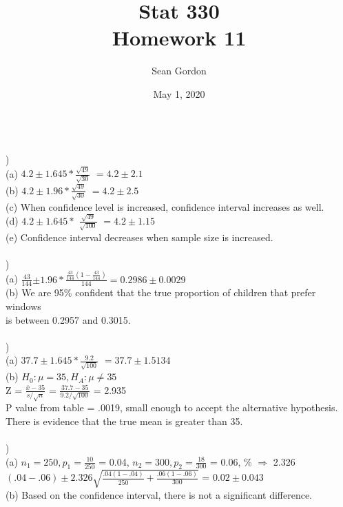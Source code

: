 \documentclass[12pt]{article}
\title{Stat 330\\Homework 11}
\author{Sean Gordon}
\date{May 1, 2020}
\begin{document}
\maketitle


\noindent\hrulefill \\


)\\
\indent (a) $4.2 \pm 1.645 * ${\Large $\frac{\sqrt{49}}{\sqrt{30}}$} $= 4.2 \pm 2.1$\\
\indent (b) $4.2 \pm 1.96 * ${\Large $\frac{\sqrt{49}}{\sqrt{30}}$} $= 4.2 \pm 2.5$\\
\indent (c) When confidence level is increased, confidence interval increases as well.\\
\indent (d) $4.2 \pm 1.645 *$ {\Large $\frac{\sqrt{49}}{\sqrt{100}}$} $= 4.2 \pm 1.15$\\
\indent (e) Confidence interval decreases when sample size is increased.\\


\noindent \hrulefill \\


)\\
\indent (a) {\Large $\frac{43}{144}$}$ \pm 1.96 * ${\Large $\frac{\frac{43}{144}(1 - \frac{43}{144})}{144}$}$ = 0.2986 \pm 0.0029$\\[.4em]
\indent (b) We are 95\% confident that the true proportion of children that prefer windows\\
\indent \indent is between 0.2957 and 0.3015.\\


\noindent \hrulefill \\


)  \\
\indent (a) $37.7 \pm 1.645 * ${\Large $\frac{9.2}{\sqrt{100}}$} $= 37.7 \pm 1.5134$\\
\indent (b) $H_0 : \mu = 35, H_A : \mu \ne 35$\\
\indent \indent Z = {\Large $\frac{\bar{x}-35}{s/\sqrt{n}}$ } = {\Large $\frac{37.7-35}{9.2/\sqrt{100}}$ } = 2.935\\
\indent \indent P value from table = .0019, small enough to accept the alternative hypothesis.\\
\indent \indent There is evidence that the true mean is greater than 35.\\


\noindent \hrulefill \\


)\\
\indent (a) $n_1 = 250, p_1 = ${\Large $\frac{10}{250}$} = 0.04, \indent $n_2 = 300, p_2 = ${\Large $\frac{18}{300}$} = 0.06, \% $\Rightarrow$ 2.326\\
\indent \indent $(.04 - .06) \pm 2.326${\Large $\sqrt{\frac{.04(1-.04)}{250} + \frac{.06(1-.06)}{300}}$} = $0.02 \pm 0.043$\\[.6em]
\indent (b) Based on the confidence interval, there is not a significant difference.\\
\end{document}
